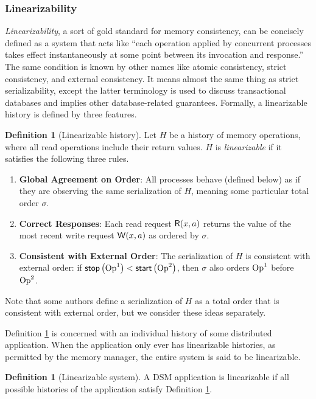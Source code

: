 \documentclass[]             %
{NASA}                       %
\theoremstyle{definition}
\newtheorem{definition}[theorem]{Definition}
\providecommand{\tightlist}{%
  \setlength{\itemsep}{0pt}\setlength{\parskip}{0pt}}
\begin{document}
\subsubsection{Linearizability}
\label{sssec:linearizability}

\emph{Linearizability}, a sort of gold standard for memory
consistency, can be concisely defined as a system that acts like
``each operation applied by concurrent processes takes effect
instantaneously at some point between its invocation and response.''
\cite{10.1145/78969.78972} The same condition is known by other names
like atomic consistency, strict consistency, and external
consistency. It means almost the same thing as strict serializability,
except the latter terminology is used to discuss transactional
databases and implies other database-related guarantees. Formally, a
linearizable history is defined by three features.
\begin{definition}[Linearizable history]
  \label{def:linearizable-history}
  Let $H$ be a history of memory operations, where all read operations
  include their return values. $H$ is \emph{linearizable} if it
  satisfies the following three rules.
\begin{enumerate}
  \tightlist
\item \textbf{Global Agreement on Order}: All processes behave
  (defined below) as if they are observing the same serialization of
  $H$, meaning some particular total order $\sigma$.
\item \textbf{Correct Responses}: Each read request
  \(\mathsf{R}\!\left(x, a\right)\) returns the value of the most recent write
  request \(\mathsf{W}\!\left(x, a\right)\) as ordered by $\sigma$.
\item \textbf{Consistent with External Order}: The serialization of
  $H$ is consistent with external order: if
  $\mathsf{stop}\left(\mathrm{Op}^1\right) < \mathsf{start}\left(\mathrm{Op}^2\right)$, then $\sigma$ also orders
  $\mathrm{Op}^1$ before $\mathrm{Op}^2$.
\end{enumerate}
\end{definition}

Note that some authors define a serialization of $H$ as a total order
that is consistent with external order, but we consider these ideas
separately.

Definition \ref{def:linearizable-history} is concerned with an individual
history of some distributed application. When the application only
ever has linearizable histories, as permitted by the memory manager,
the entire system is said to be linearizable.

\begin{definition}[Linearizable system]
  \label{def:linearizable-system}
  A DSM application is linearizable if all possible histories of the
  application satisfy Definition \ref{def:linearizable-history}.
\end{definition}
\end{document}
